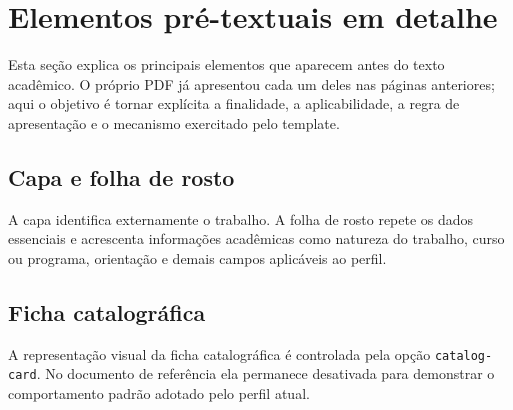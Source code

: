 \section{Elementos pré-textuais em detalhe}\label{sec:pretextuais-detalhe}

Esta seção explica os principais elementos que aparecem antes do texto acadêmico. O próprio PDF já apresentou cada um deles nas páginas anteriores; aqui o objetivo é tornar explícita a finalidade, a aplicabilidade, a regra de apresentação e o mecanismo exercitado pelo template.

\subsection{Capa e folha de rosto}

A capa identifica externamente o trabalho. A folha de rosto repete os dados essenciais e acrescenta informações acadêmicas como natureza do trabalho, curso ou programa, orientação e demais campos aplicáveis ao perfil.





\subsection{Ficha catalográfica}

A representação visual da ficha catalográfica é controlada pela opção \texttt{catalog-card}. No documento de referência ela permanece desativada para demonstrar o comportamento padrão adotado pelo perfil atual.

